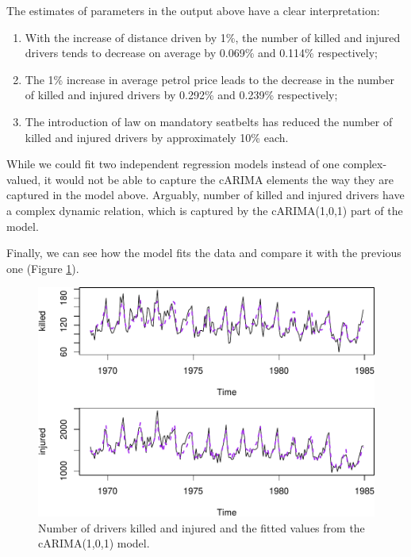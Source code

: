 \documentclass[
]{book}
\providecommand{\tightlist}{%
  \setlength{\itemsep}{0pt}\setlength{\parskip}{0pt}}
\begin{document}
The estimates of parameters in the output above have a clear interpretation:

\begin{enumerate}
\def\labelenumi{\arabic{enumi}.}
\tightlist
\item
  With the increase of distance driven by 1\%, the number of killed and injured drivers tends to decrease on average by 0.069\% and 0.114\% respectively;
\item
  The 1\% increase in average petrol price leads to the decrease in the number of killed and injured drivers by 0.292\% and 0.239\% respectively;
\item
  The introduction of law on mandatory seatbelts has reduced the number of killed and injured drivers by approximately 10\% each.
\end{enumerate}

While we could fit two independent regression models instead of one complex-valued, it would not be able to capture the cARIMA elements the way they are captured in the model above. Arguably, number of killed and injured drivers have a complex dynamic relation, which is captured by the cARIMA(1,0,1) part of the model.

Finally, we can see how the model fits the data and compare it with the previous one (Figure \ref{fig:seatbeltsDataModelFinal}).

\begin{figure}
\centering
\includegraphics{Svetunkov---Svetunkov---Complex-Valued-Econometrics_files/figure-latex/seatbeltsDataModelFinal-1.pdf}
\caption{\label{fig:seatbeltsDataModelFinal}Number of drivers killed and injured and the fitted values from the cARIMA(1,0,1) model.}
\end{figure}
\end{document}
